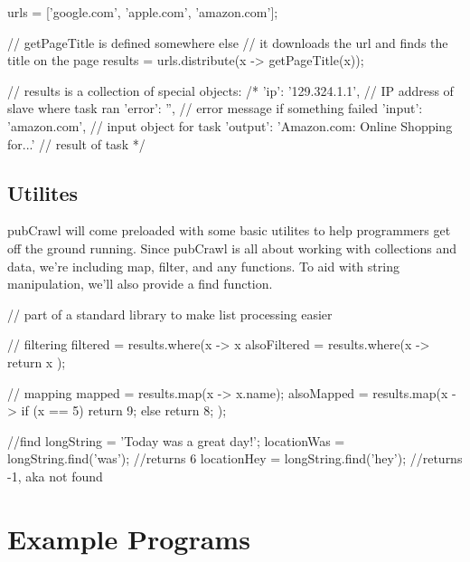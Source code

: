 \documentclass[letterpaper]{article}
\begin{document}
\begin{mdframed}[hidealllines=true,backgroundcolor=gray!10,skipbelow=1em,skipabove=.5em]
\begin{code}
urls = ['google.com', 'apple.com', 'amazon.com'];

// getPageTitle is defined somewhere else
// it downloads the url and finds the title on the page
results = urls.distribute(x -> getPageTitle(x));

// results is a collection of special objects:
/* 
{
  'ip': '129.324.1.1', // IP address of slave where task ran
  'error': '', // error message if something failed
  'input': 'amazon.com', // input object for task 
  'output': 'Amazon.com: Online Shopping for...' // result of task
}
*/
\end{code}
\end{mdframed}
\subsection{Utilites}
pubCrawl will come preloaded with some basic utilites to help programmers get off the ground running. Since pubCrawl is all about working with collections and data, we're including map, filter, and any functions. To aid with string manipulation, we'll also provide a find function.
\begin{mdframed}[hidealllines=true,backgroundcolor=gray!10,skipbelow=1em,skipabove=.5em]
\begin{code}
// part of a standard library to make list processing easier

// filtering
filtered = results.where(x -> x %
alsoFiltered = results.where(x -> {
	return x %
});

// mapping
mapped = results.map(x -> x.name);
alsoMapped = results.map(x -> {
	if (x == 5) {
		return 9;
	} else {
		return 8;
	}
});

//find
longString = 'Today was a great day!';
locationWas = longString.find('was'); //returns 6
locationHey = longString.find('hey'); //returns -1, aka not found

\end{code}
\end{mdframed}

\section{Example Programs}
\end{document}
